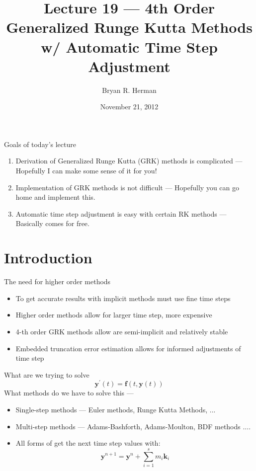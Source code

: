 \documentclass[serif]{beamer}
\title{Lecture 19 --- 4th Order Generalized Runge Kutta Methods w/ Automatic Time Step Adjustment}
\author{Bryan R. Herman}
\date{November 21, 2012}
\begin{document}
\frame{\titlepage}

\begin{frame}{Goals of today's lecture}
  \begin{enumerate}
  \item<1-> Derivation of Generalized Runge Kutta (GRK) methods is complicated
            --- Hopefully I can make some sense of it for you!
  \vfill
  \item<1-> Implementation of GRK methods is not difficult --- Hopefully you
            can go home and implement this.
  \vfill
  \item<1-> Automatic time step adjustment is easy with certain RK methods ---
            Basically comes for free.
  \end{enumerate}
\end{frame}

\section{Introduction}

\begin{frame}{The need for higher order methods}
  \begin{itemize}
  \item<1-> To get accurate results with implicit methods must use fine time steps
  \vfill
  \item<1-> Higher order methods allow for larger time step, more expensive
  \vfill
  \item<1-> 4-th order GRK methods allow are semi-implicit and relatively stable
  \vfill
  \item<1-> Embedded truncation error estimation allows for informed adjustments
            of time step
  \end{itemize}
\end{frame}

\begin{frame}{What are we trying to solve}
  \begin{equation}
    \nonumber \mathbf{y}^\prime\left(t\right) = \mathbf{f}\left(t,\mathbf{y}\left(t\right)\right)
  \end{equation}
  \vfill
  What methods do we have to solve this ---
  \vfill
  \begin{itemize}
   \item<1-> Single-step methods --- Euler methods,  Runge Kutta Methods, ...
   \vfill
   \item<1-> Multi-step methods  --- Adams-Bashforth, Adams-Moulton, BDF methods ....
  \item<2-> All forms of {\color{blue}{Runge Kutta}} get the next time step values with:
  \begin{equation}
    \nonumber \mathbf{y}^{n+1} = \mathbf{y}^n + \sum_{i=1}^s m_i \mathbf{k}_i
  \end{equation}
  \begin{center}
    \color{red}{All the work goes into determining $k$ parameters}
  \end{center}
  \end{itemize}
\end{frame}
\end{document}
